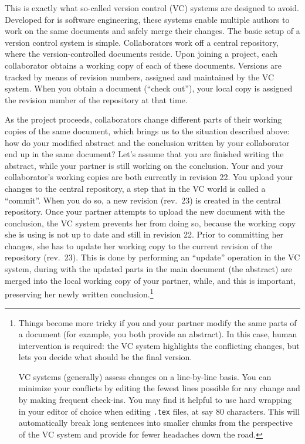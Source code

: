 \documentclass[]{article}
\begin{document}
This is exactly what so-called version control (VC) systems are designed to avoid. 
Developed for is software engineering, these systems enable multiple authors to 
work on the same documents and safely merge their changes. The basic setup of a 
version control system is simple. Collaborators work off a central repository, where 
the version-controlled documents reside. Upon joining a project, each collaborator 
obtains a working copy of each of these documents. Versions are tracked by means of 
revision numbers, assigned and maintained by the VC system. When you obtain a document 
(``check out''), your local copy is assigned the revision number of the repository at 
that time. 

As the project proceeds, collaborators change different parts of their working copies 
of the same document, which brings us to the situation described above: how do your 
modified abstract and the conclusion written by your collaborator end up in the same 
document? Let's assume that you are finished writing the abstract, while your partner 
is still working on the conclusion. Your and your collaborator's working copies are 
both currently in revision 22. You upload your changes to the central repository, a 
step that in the VC world is called a ``commit''. When you do so, a new revision 
(rev.~23) is created in the central repository. Once your partner attempts to upload 
the new document with the conclusion, the VC system prevents her from doing so, because 
the working copy she is using is not up to date and still in revision 22. Prior to 
committing her changes, she has to update her working copy to the current revision of 
the repository (rev.~23). This is done by performing an ``update'' operation in the VC 
system, during with the updated parts in the main document (the abstract) are merged 
into the local working copy of your partner, while, and this is important, preserving 
her newly written conclusion.\footnote{Things become more tricky if you and your 
partner modify the same parts of a document (for example, you both provide an 
abstract). In this case, human intervention is required: the VC system highlights the 
conflicting changes, but lets you decide what should be the final version.

VC systems (generally) assess changes on a line-by-line basis. You can
minimize your conflicts by editing the fewest lines possible for any change
and by making frequent check-ins. You may find it helpful to use hard wrapping
in your editor of choice when editing \texttt{.tex} files, at say 80
characters. This will automatically break long sentences into smaller chunks
from the perspective of the VC system and provide for fewer headaches down the
road.}
\end{document}
